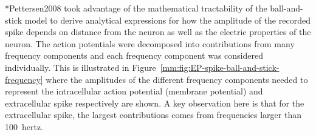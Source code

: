\citeasnoun**{Pettersen2008} took advantage of the mathematical tractability of the ball-and-stick model to
derive analytical expressions for how the amplitude of the recorded spike depends on distance from the neuron as well
as the electric properties of the neuron. The action potentials were decomposed into contributions from
many frequency components and each frequency component was considered individually.
This is illustrated in Figure~\ref{mm:fig:EP-spike-ball-and-stick-frequency} where the amplitudes of the different frequency components needed to
represent the intracellular action potential (membrane potential) and extracellular spike respectively are shown.
A key observation here is that for the extracellular spike, the largest contributions comes from frequencies larger than 100~hertz.



